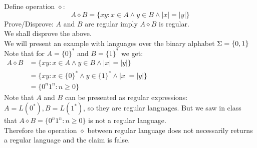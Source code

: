 Define operation $\diamond$:
\[
    A \diamond B = \{xy : x \in A \wedge y \in B \wedge |x| = |y|\}
\]
Prove/Disprove: $A$ and $B$ are regular imply $A \diamond B$ is regular. \\

We shall disprove the above. \\
We will present an example with languages over the binary alphabet $\Sigma = \{0, 1\}$ \\
Note that for $A=\{0\}^*$ and $B=\{1\}^*$ we get: \\
$
    \begin{aligned}
        A \diamond B & = \{xy : x \in A \wedge y \in B \wedge |x| = |y|\}             \\
                     & = \{xy : x \in \{0\}^* \wedge y \in \{1\}^* \wedge |x| = |y|\} \\
                     & = \{0^n 1^n : n \geq 0\}
    \end{aligned}
$ \\
Note that $A$ and $B$ can be presented as regular expressions: $A=L(0^*), B=L(1^*)$,
so they are regular languages. But we saw in class that $A \diamond B =\{0^n 1^n : n \geq 0\}$
is not a regular language. \\
Therefore the operation $\diamond$ between regular language does not necessarily
returns a regular language and the claim is false. \\